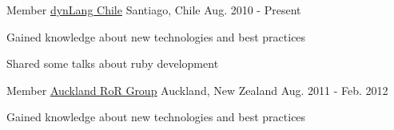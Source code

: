

\begin{cventries}

  \cventry
    {Member} %
    {\href{http://www.meetup.com/dynlangchile/}{\underline{dynLang Chile}}} %
    {Santiago, Chile} %
    {Aug. 2010 - Present} %
    {
      \begin{cvitems} %
        \item {Gained knowledge about new technologies and best practices}
        \item {Shared some talks about ruby development}
      \end{cvitems}
    }

  \cventry
    {Member} %
    {\href{http://www.meetup.com/aucklandrails/}{\underline{Auckland RoR Group}}} %
    {Auckland, New Zealand} %
    {Aug. 2011 - Feb. 2012} %
    {
      \begin{cvitems} %
        \item {Gained knowledge about new technologies and best practices}
      \end{cvitems}
    }

\end{cventries}
